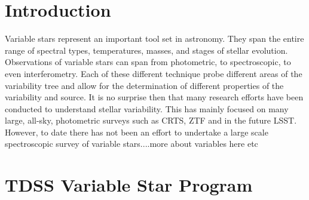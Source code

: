 \documentclass[twocolumn, tighten, astrosymb]{aastex631}
\begin{document}


\section{Introduction} \label{sec:introduction}

Variable stars represent an important tool set in astronomy. They span the entire range of spectral types, temperatures, masses, and stages of stellar evolution. Observations of variable stars can span from photometric, to spectroscopic, to even interferometry. Each of these different technique probe different areas of the variability tree and allow for the determination of different properties of the variability and source. It is no surprise then that many research efforts have been conducted to understand stellar variability. This has mainly focused on many large, all-sky, photometric surveys such as CRTS, ZTF and in the future LSST. However, to date there has not been an effort to undertake a large scale spectroscopic survey of variable stars....more about variables here etc


\section{TDSS Variable Star Program} \label{sec:TDSS}
\end{document}
